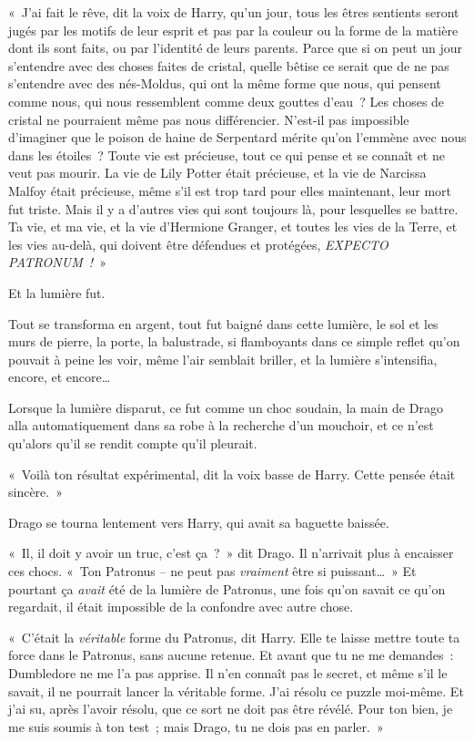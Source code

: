 «~J'ai fait le rêve, dit la voix de Harry, qu'un jour, tous les êtres sentients\footnotemark{} seront jugés par les motifs de leur esprit et pas par la couleur ou la forme de la matière dont ils sont faits, ou par l'identité de leurs parents. Parce que si on peut un jour s'entendre avec des choses faites de cristal, quelle bêtise ce serait que de ne pas s'entendre avec des nés-Moldus, qui ont la même forme que nous, qui pensent comme nous, qui nous ressemblent comme deux gouttes d'eau~? Les choses de cristal ne pourraient même pas nous différencier. N'est-il pas impossible d'imaginer que le poison de haine de Serpentard mérite qu'on l'emmène avec nous dans les étoiles~? Toute vie est précieuse, tout ce qui pense et se connaît et ne veut pas mourir. La vie de Lily Potter était précieuse, et la vie de Narcissa Malfoy était précieuse, même s'il est trop tard pour elles maintenant, leur mort fut triste. Mais il y a d'autres vies qui sont toujours là, pour lesquelles se battre. Ta vie, et ma vie, et la vie d'Hermione Granger, et toutes les vies de la Terre, et les vies au-delà, qui doivent être défendues et protégées, \emph{EXPECTO PATRONUM~!}~»

Et la lumière fut.

Tout se transforma en argent, tout fut baigné dans cette lumière, le sol et les murs de pierre, la porte, la balustrade, si flamboyants dans ce simple reflet qu'on pouvait à peine les voir, même l'air semblait briller, et la lumière s'intensifia, encore, et encore…

Lorsque la lumière disparut, ce fut comme un choc soudain, la main de Drago alla automatiquement dans sa robe à la recherche d'un mouchoir, et ce n'est qu'alors qu'il se rendit compte qu'il pleurait.

«~Voilà ton résultat expérimental, dit la voix basse de Harry. Cette pensée était sincère.~»

Drago se tourna lentement vers Harry, qui avait sa baguette baissée.

«~Il, il doit y avoir un truc, c'est ça~?~» dit Drago. Il n'arrivait plus à encaisser ces chocs. «~Ton Patronus -- ne peut pas \emph{vraiment} être si puissant…~» Et pourtant ça \emph{avait} été de la lumière de Patronus, une fois qu'on savait ce qu'on regardait, il était impossible de la confondre avec autre chose.

«~C'était la \emph{véritable} forme du Patronus, dit Harry. Elle te laisse mettre toute ta force dans le Patronus, sans aucune retenue. Et avant que tu ne me demandes~: Dumbledore ne me l'a pas apprise. Il n'en connaît pas le secret, et même s'il le savait, il ne pourrait lancer la véritable forme. J'ai résolu ce puzzle moi-même. Et j'ai su, après l'avoir résolu, que ce sort ne doit pas être révélé. Pour ton bien, je me suis soumis à ton test~; mais Drago, tu ne dois pas en parler.~»

